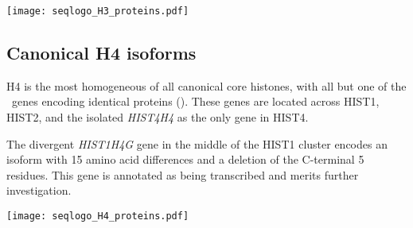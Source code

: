     \begin{table}
      \caption{%
        Canonical H3 encoded protein isoforms.
        Upper panel shows isoform variations relative to most common isoform
        using HGVS recommended nomenclature \citep{mutnomenclature2003}.
        Lower panel shows sequence logo of all isoforms aligned 
        with invariant residues in grey.
      }
      \label{tab:H3-consensus}
      
      \texttt{[image: seqlogo\_H3\_proteins.pdf]}
    \end{table}

  \subsection{Canonical H4 isoforms}
    H4 is the most homogeneous of all canonical core histones,
    with all but one of the \HFourCodingGenes{}~genes encoding
    identical proteins ().
    These genes are located across HIST1, HIST2, and the isolated
    \textit{HIST4H4} as the only gene in HIST4.

    The divergent \textit{HIST1H4G} gene in the middle of the HIST1 cluster
    encodes an isoform with 15 amino acid differences and a deletion of the C-terminal 5 residues.
    This gene is annotated as being transcribed and merits further investigation.

    \begin{table}
      \caption{%
        Canonical H4 encoded protein isoforms.
        Upper panel shows isoform variations relative to most common isoform
        using HGVS recommended nomenclature \citep{mutnomenclature2003}.
        Lower panel shows sequence logo of all isoforms aligned 
        with invariant residues in grey.
      }
      \label{tab:H4-consensus}
      
      \texttt{[image: seqlogo\_H4\_proteins.pdf]}
    \end{table}
